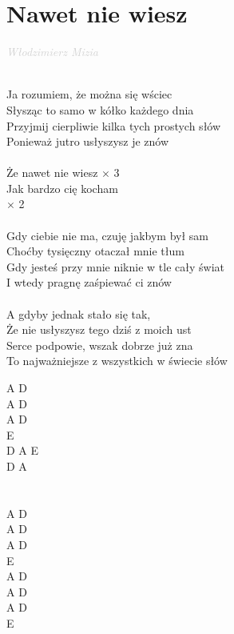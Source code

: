 \documentclass[a5paper, 10pt]{book}
\begin{document}
\section{Nawet nie wiesz}\textcolor{lightgray}{\textit{Włodzimierz Mizia}}\\~\\
\begin{minipage}[t]{0.7\textwidth}
  Ja rozumiem, że można się wściec		\\
Słysząc to samo w kółko każdego dnia	\\
 	Przyjmij cierpliwie kilka tych prostych słów	\\
Ponieważ jutro usłyszysz je znów			\\
\\
\hspace*{5mm}Że nawet nie wiesz $\times$ 3		\\
\hspace*{5mm}Jak bardzo cię kocham\\
\hspace*{12mm}$\times$ 2\\
\\
Gdy ciebie nie ma, czuję jakbym był sam		\\
Choćby tysięczny otaczał mnie tłum\\
Gdy jesteś przy mnie niknie w tle cały świat\\
I wtedy pragnę zaśpiewać ci znów\\
\\
A gdyby jednak stało się tak,\\
Że nie usłyszysz tego dziś z moich ust\\
Serce podpowie, wszak dobrze już zna\\
To najważniejsze z wszystkich w świecie słów\\

\end{minipage}
\begin{minipage}[t]{0.3\textwidth}
  A D \\
  A D \\
A D \\
E \\
 
D A E\\
D A \\
\\
\\
A D \\
A D \\
A D \\
E \\

A D \\
A D \\
A D \\
E \\
\end{minipage}
\end{document}
